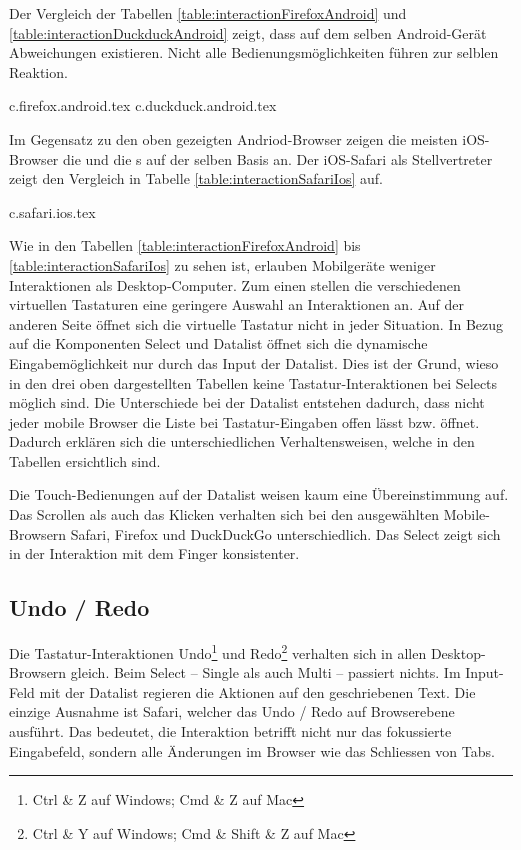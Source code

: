 Der Vergleich der Tabellen \ref{table:interactionFirefoxAndroid} und \ref{table:interactionDuckduckAndroid} zeigt, dass auf dem selben Android-Gerät Abweichungen existieren. 
Nicht alle Bedienungsmöglichkeiten führen zur selblen Reaktion. 

{c.firefox.android.tex}
{c.duckduck.android.tex}

\clearpage
Im Gegensatz zu den oben gezeigten Andriod-Browser zeigen die meisten iOS-Browser die  und die s auf der selben Basis an. 
Der iOS-Safari als Stellvertreter zeigt den Vergleich in Tabelle \ref{table:interactionSafariIos} auf. 

{c.safari.ios.tex}

Wie in den Tabellen \ref{table:interactionFirefoxAndroid} bis \ref{table:interactionSafariIos} zu sehen ist, erlauben Mobilgeräte weniger Interaktionen als Desktop-Computer. 
Zum einen stellen die verschiedenen virtuellen Tastaturen eine geringere Auswahl an Interaktionen an. 
Auf der anderen Seite öffnet sich die virtuelle Tastatur nicht in jeder Situation. 
In Bezug auf die Komponenten Select und Datalist öffnet sich die dynamische Eingabemöglichkeit nur durch das Input der Datalist. 
Dies ist der Grund, wieso in den drei oben dargestellten Tabellen keine Tastatur-Interaktionen bei Selects möglich sind. 
Die Unterschiede bei der Datalist entstehen dadurch, dass nicht jeder mobile Browser die Liste bei Tastatur-Eingaben offen lässt bzw. öffnet. 
Dadurch erklären sich die unterschiedlichen Verhaltensweisen, welche in den Tabellen ersichtlich sind. 

Die Touch-Bedienungen auf der Datalist weisen kaum eine Übereinstimmung auf. 
Das Scrollen als auch das Klicken verhalten sich bei den ausgewählten Mobile-Browsern Safari, Firefox und DuckDuckGo unterschiedlich. 
Das Select zeigt sich in der Interaktion mit dem Finger konsistenter. 


\subsection{Undo / Redo}
\label{sec:undoRedo}

Die Tastatur-Interaktionen Undo\footnote{
    Ctrl \& Z auf Windows; Cmd \& Z auf Mac
} und Redo\footnote{
    Ctrl \& Y auf Windows; Cmd \& Shift \& Z auf Mac
} verhalten sich in allen Desktop-Browsern gleich. 
Beim Select – Single als auch Multi – passiert nichts. 
Im Input-Feld mit der Datalist regieren die Aktionen auf den geschriebenen Text. 
Die einzige Ausnahme ist Safari, welcher das Undo / Redo auf Browserebene ausführt. 
Das bedeutet, die Interaktion betrifft nicht nur das fokussierte Eingabefeld, sondern alle Änderungen im Browser wie das Schliessen von Tabs. 

